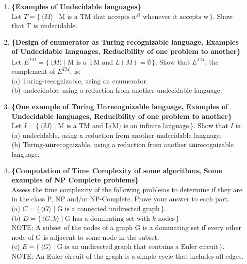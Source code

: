 \documentclass[11pt, article, oneside]{memoir}
\newcommand{\set}[1]{\{\, #1\, \}}
\begin{document}
\begin{enumerate}
    \item
    \textbf{\{Examples of Undecidable languages\}}
    \\Let \(T = \set{\langle M\rangle \mid \text{M is a TM that accepts }w^R \text{ whenever it accepts w}}\). Show that T is undecidable.

    \item
    \textbf{\{Design of enumerator as Turing recognizable language, Examples of Undecidable languages, Reducibility of one problem to another\}}
    \\Let \(E^{TM} = \set{\langle M\rangle \mid \text{M is a TM and }L(M) = \emptyset}\). Show that \(\overline{E^{TM}}\), the complement of \(E^{TM}\), is:
    \\(a) Turing-recognizable, using an enumerator.
    \\(b) undecidable, using a reduction from another undecidable language.

    \item
    \textbf{\{One example of Turing Unrecognizable language, Examples of Undecidable languages, Reducibility of one problem to another\}}
    \\Let \(I = \set{\langle M\rangle \mid \text{M is a TM and L(M) is an infinite language}}\). Show that \(I\) is:
    \\(a) undecidable, using a reduction from another undecidable language.
    \\(b) Turing-\textbf{un}recognizable, using a reduction from another \textbf{un}recognizable language.

    \item
    \textbf{\{Computation of  Time Complexity of some algorithms, Some examples of NP Complete problems\}}
    \\Assess the time complexity of the following problems to determine if they are in the class P, NP and/or NP-Complete. Prove your answer to each part.
    \\(a) \(C = \set{\langle G\rangle \mid \text{G is a connected undirected graph}}\).
    \\(b) \(D = \set{\langle G, k\rangle \mid \text{G has a dominating set with }k\text{ nodes}}\)
    \\NOTE: A subset of the nodes of a graph G is a dominating set if every other node of G is adjacent to some node in the subset.
    \\(c) \(E = \set{\langle G\rangle \mid \text{G is an undirected graph that contains a Euler circuit}}\).
    \\NOTE: An Euler circuit of the graph is a simple cycle that includes all edges.
\end{enumerate}
\end{document}

